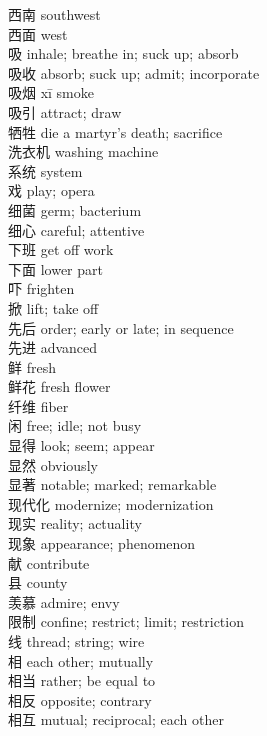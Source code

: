 西南 \quad southwest\\
西面 \quad west\\
吸 \quad inhale; breathe in; suck up; absorb\\
吸收 \quad absorb; suck up; admit; incorporate\\
吸烟 \quad xī \quad smoke\\
吸引 \quad attract; draw\\
牺牲 \quad die a martyr's death; sacrifice\\
洗衣机 \quad washing machine\\
系统 \quad system\\
戏 \quad play; opera\\
细菌 \quad germ; bacterium\\
细心 \quad careful; attentive\\
下班 \quad get off work\\
下面 \quad lower part\\
吓 \quad frighten\\
掀 \quad lift; take off\\
先后 \quad order; early or late; in sequence\\
先进 \quad advanced\\
鲜 \quad fresh\\
鲜花 \quad fresh flower\\
纤维 \quad fiber\\
闲 \quad free; idle; not busy\\
显得 \quad look; seem; appear\\
显然 \quad obviously\\
显著 \quad notable; marked; remarkable\\
现代化 \quad modernize; modernization\\
现实 \quad reality; actuality\\
现象 \quad appearance; phenomenon\\
献 \quad contribute\\
县 \quad county\\
羡慕 \quad admire; envy\\
限制 \quad confine; restrict; limit; restriction\\
线 \quad thread; string; wire\\
相 \quad each other; mutually\\
相当 \quad rather; be equal to\\
相反 \quad opposite; contrary\\
相互 \quad mutual; reciprocal; each other\\
